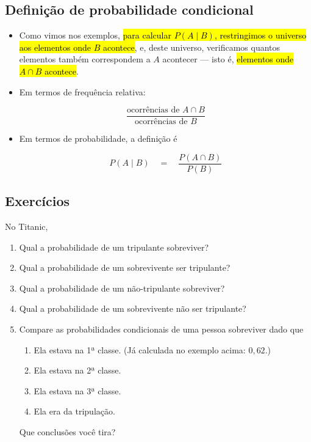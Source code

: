\documentclass[
  11pt]{report}
\begin{document}
\hypertarget{definiuxe7uxe3o-de-probabilidade-condicional}{%
\subsection{Definição de probabilidade condicional}\label{definiuxe7uxe3o-de-probabilidade-condicional}}

\begin{itemize}
\item
  Como vimos nos exemplos, {\hl{para calcular $P(A \mid B)$, restringimos o universo aos elementos onde $B$ acontece}}, e, deste universo, verificamos quantos elementos também correspondem a $A$ acontecer --- isto é, {\hl{elementos onde $A \cap B$ acontece}}.
\item
  Em termos de frequência relativa:

  \[
  \frac{\text{ocorrências de } A \cap B}{\text{ocorrências de }B}
  \]
\item
  Em termos de probabilidade, a definição é

  \[
  P(A \mid B) \quad=\quad \frac{P(A \cap B)}{P(B)}
  \]
\end{itemize}

\hypertarget{exercuxedcios-14}{%
\subsection{Exercícios}\label{exercuxedcios-14}}

No Titanic,

\begin{enumerate}
\def\labelenumi{\arabic{enumi}.}
\item
  Qual a probabilidade de um tripulante sobreviver?
\item
  Qual a probabilidade de um sobrevivente ser tripulante?
\item
  Qual a probabilidade de um não-tripulante sobreviver?
\item
  Qual a probabilidade de um sobrevivente não ser tripulante?
\item
  Compare as probabilidades condicionais de uma pessoa sobreviver dado que

  \begin{enumerate}
  \def\labelenumii{\alph{enumii}.}
  \item
    Ela estava na 1ª classe. (Já calculada no exemplo acima: $0{,}62$.)
  \item
    Ela estava na 2ª classe.
  \item
    Ela estava na 3ª classe.
  \item
    Ela era da tripulação.
  \end{enumerate}

  Que conclusões você tira?
\end{enumerate}
\end{document}
